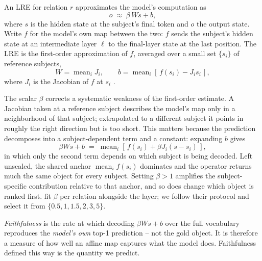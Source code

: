 \documentclass[11pt]{article}
\begin{document}
An LRE for relation $r$ approximates the model's computation as
\begin{equation}
o \;\approx\; \beta\, W s + b ,
\end{equation}
where $s$ is the hidden state at the subject's final token and $o$ the
output state. Write $f$ for the model's own map between the two: $f$
sends the subject's hidden state at an intermediate layer $\ell$ to the
final-layer state at the last position.
 The LRE is the first-order approximation of $f$, averaged over a
small set $\{s_i\}$ of reference subjects,
\begin{equation}
W = \operatorname{mean}_i J_i , \qquad
b = \operatorname{mean}_i\!\left[\, f(s_i) - J_i s_i \,\right] ,
\label{eq:wb}
\end{equation}
where $J_i$ is the Jacobian of $f$ at $s_i$
\citep{hernandez2024linearity}.

The scalar $\beta$ corrects a systematic weakness of the first-order
estimate. A Jacobian taken at a reference subject describes the model's
map only in a neighborhood of that subject; extrapolated to a different
subject it points in roughly the right direction but is too short. This
matters because the prediction decomposes into a subject-dependent term
and a constant: expanding $b$ gives
\begin{equation}
\beta W s + b \;=\; \operatorname{mean}_i\!\left[\,f(s_i) + \beta J_i (s - s_i)\,\right],
\label{eq:beta}
\end{equation}
in which only the second term depends on which subject is being decoded.
Left unscaled, the shared anchor $\operatorname{mean}_i f(s_i)$ dominates
and the operator returns much the same object for every subject.
Setting $\beta > 1$ amplifies the subject-specific contribution relative
to that anchor, and so does change which object is ranked first.
\citet{hernandez2024linearity} fit $\beta$ per relation alongside the
layer; we follow their protocol and select it from
$\{0.5, 1, 1.5, 2, 3, 5\}$.



\emph{Faithfulness} is the rate at which
decoding $\beta W s + b$ over the full vocabulary reproduces the
\emph{model's own} top-1 prediction -- not the gold object. It is therefore
a measure of how well an affine map captures what the model
does. Faithfulness defined this way is
the quantity we predict.
\end{document}
